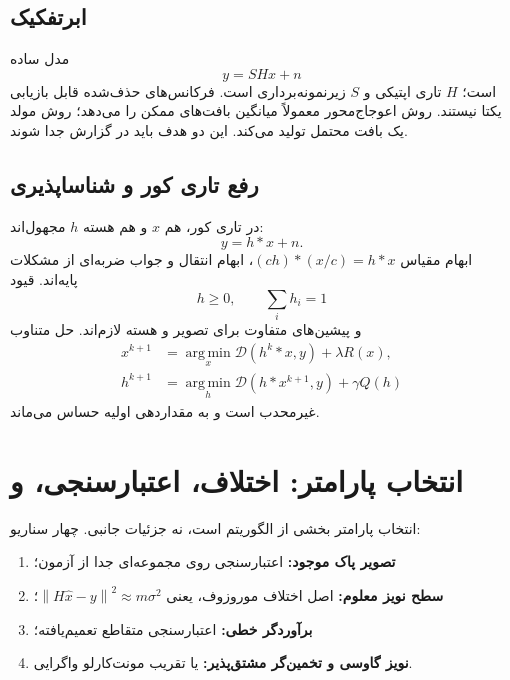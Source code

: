 \documentclass[12pt,openany,oneside]{book}
\newcommand{\norm}[1]{\left\lVert #1\right\rVert}
\newcommand{\argmin}{\operatorname*{arg\,min}}
\begin{document}
\subsection{ابرتفکیک}
مدل ساده
\begin{equation}
y=SHx+n
\end{equation}
است؛ \(H\) تاری اپتیکی و \(S\) زیرنمونه‌برداری است. فرکانس‌های حذف‌شده قابل بازیابی یکتا نیستند.
روش اعوجاج‌محور معمولاً میانگین بافت‌های ممکن را می‌دهد؛ روش مولد یک بافت محتمل تولید می‌کند. این دو هدف باید در گزارش جدا شوند.

\subsection{رفع تاری کور و شناساپذیری}
در تاری کور، هم \(x\) و هم هسته \(h\) مجهول‌اند:
\begin{equation}
y=h*x+n.
\end{equation}
ابهام مقیاس \((ch)*(x/c)=h*x\)، ابهام انتقال و جواب ضربه‌ای از مشکلات پایه‌اند. قیود
\begin{equation}
h\ge0,\qquad \sum_i h_i=1
\end{equation}
و پیشین‌های متفاوت برای تصویر و هسته لازم‌اند. حل متناوب
\begin{align}
x^{k+1}&=\argmin_x \mathcal D(h^k*x,y)+\lambda R(x),\\
h^{k+1}&=\argmin_h \mathcal D(h*x^{k+1},y)+\gamma Q(h)
\end{align}
غیرمحدب است و به مقداردهی اولیه حساس می‌ماند.

\section{انتخاب پارامتر: اختلاف، اعتبارسنجی،  و }

انتخاب پارامتر بخشی از الگوریتم است، نه جزئیات جانبی. چهار سناریو:
\begin{enumerate}
\item \textbf{تصویر پاک موجود:} اعتبارسنجی روی مجموعه‌ای جدا از آزمون؛
\item \textbf{سطح نویز معلوم:} اصل اختلاف موروزوف، یعنی \(\norm{H\hat x-y}^2\approx m\sigma^2\)؛
\item \textbf{برآوردگر خطی:} اعتبارسنجی متقاطع تعمیم‌یافته؛
\item \textbf{نویز گاوسی و تخمین‌گر مشتق‌پذیر:}  یا تقریب مونت‌کارلو واگرایی.
\end{enumerate}
\end{document}
